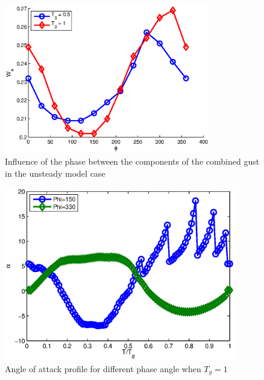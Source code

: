 \documentclass[compress]{beamer}
\begin{document}
\begin{frame}
  \begin{figure}[h]
    \centering
    \includegraphics[width=0.8\textwidth]{./Figures/combined_gust_amplitude_vs_phase_GK.eps}
    \caption{Influence of the phase between the components of the combined gust in the unsteady model case}
  \end{figure}
\end{frame}

\begin{frame}
  \begin{figure}[h]
    \centering
    \includegraphics[width=0.9\textwidth]{./Figures/alpha_vs_Tg_GK_phi_Tg=1.eps}
    \caption{Angle of attack profile for different phase angle when $T_g=1$}
  \end{figure}
\end{frame}
\end{document}
